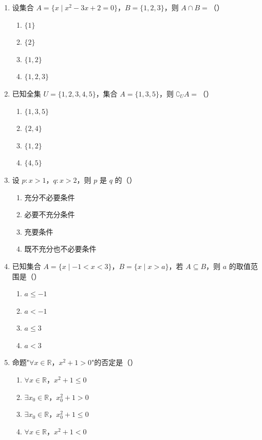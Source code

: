 \documentclass[12pt, a4paper]{ctexart}
\begin{document}
\begin{enumerate}
\item 设集合 $A=\{x\mid x^2-3x+2=0\}$，$B=\{1,2,3\}$，则 $A\cap B=$（\quad）
  \begin{enumerate}[label=\Alph*., itemsep=0pt]
    \item $\{1\}$ \quad \item $\{2\}$ \quad \item $\{1,2\}$ \quad \item $\{1,2,3\}$
  \end{enumerate}

\item 已知全集 $U=\{1,2,3,4,5\}$，集合 $A=\{1,3,5\}$，则 $\complement_U A=$（\quad）
  \begin{enumerate}[label=\Alph*., itemsep=0pt]
    \item $\{1,3,5\}$ \quad \item $\{2,4\}$ \quad \item $\{1,2\}$ \quad \item $\{4,5\}$
  \end{enumerate}

\item 设 $p: x>1$，$q: x>2$，则 $p$ 是 $q$ 的（\quad）
  \begin{enumerate}[label=\Alph*., itemsep=0pt]
    \item 充分不必要条件 \quad \item 必要不充分条件
    \item 充要条件 \quad \item 既不充分也不必要条件
  \end{enumerate}

\item 已知集合 $A=\{x\mid -1<x<3\}$，$B=\{x\mid x>a\}$，若 $A\subseteq B$，则 $a$ 的取值范围是（\quad）
  \begin{enumerate}[label=\Alph*., itemsep=0pt]
    \item $a\leq -1$ \quad \item $a<-1$ \quad \item $a\leq 3$ \quad \item $a<3$
  \end{enumerate}

\item 命题"$\forall x\in\mathbb{R}$，$x^2+1>0$"的否定是（\quad）
  \begin{enumerate}[label=\Alph*., itemsep=0pt]
    \item $\forall x\in\mathbb{R}$，$x^2+1\leq 0$
    \item $\exists x_0\in\mathbb{R}$，$x_0^2+1>0$
    \item $\exists x_0\in\mathbb{R}$，$x_0^2+1\leq 0$
    \item $\forall x\in\mathbb{R}$，$x^2+1<0$
  \end{enumerate}


\end{enumerate}
\end{document}
